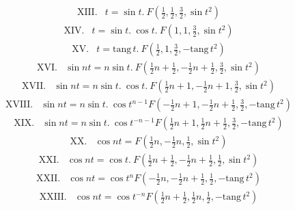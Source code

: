 \[
\begin{array}{rl}
\mathrm{XIII.}&t=\sin t.\ F(\frac{1}{2},\frac{1}{2},\frac{3}{2},\sin t^2)
\end{array}
\]
\[
\begin{array}{rl}
\mathrm{XIV.}&t=\sin t.\ \cos t.\ F(1,1,\frac{3}{2},\sin t^2)
\end{array}
\]
\[
\begin{array}{rl}
\mathrm{XV.}&t=\mathrm{tang}\,t.\ F(\frac{1}{2},1,\frac{3}{2},-\mathrm{tang}\,t^2)
\end{array}
\]
\[
\begin{array}{rl}
\mathrm{XVI.}&\sin nt=n\sin t.\ F(\frac{1}{2}n+\frac{1}{2},-\frac{1}{2}n+\frac{1}{2},\frac{3}{2},\sin t^2)
\end{array}
\]
\[
\begin{array}{rl}
\mathrm{XVII.}&\sin nt=n\sin t.\ \cos t.\ F(\frac{1}{2}n+1,-\frac{1}{2}n+1,\frac{3}{2},\sin t^2)
\end{array}
\]
\[
\begin{array}{rl}
\mathrm{XVIII.}&\sin nt=n\sin t.\ \cos t^{n-1}F(-\frac{1}{2}n+1,-\frac{1}{2}n+\frac{1}{2},\frac{3}{2},-\mathrm{tang}\,t^2)
\end{array}
\]
\[
\begin{array}{rl}
\mathrm{XIX.}&\sin nt=n\sin t.\ \cos t^{-n-1}F(\frac{1}{2}n+1,\frac{1}{2}n+\frac{1}{2},\frac{3}{2},-\mathrm{tang}\,t^2)
\end{array}
\]
\[
\begin{array}{rl}
\mathrm{XX.}&\cos nt=F(\frac{1}{2}n,-\frac{1}{2}n,\frac{1}{2},\sin t^2)
\end{array}
\]
\[
\begin{array}{rl}
\mathrm{XXI.}&\cos nt=\cos t.\ F(\frac{1}{2}n+\frac{1}{2},-\frac{1}{2}n+\frac{1}{2},\frac{1}{2},\sin t^2)
\end{array}
\]
\[
\begin{array}{rl}
\mathrm{XXII.}&\cos nt=\cos t^nF(-\frac{1}{2}n,-\frac{1}{2}n+\frac{1}{2},\frac{1}{2},-\mathrm{tang}\,t^2)
\end{array}
\]
\[
\begin{array}{rl}
\mathrm{XXIII.}&\cos nt=\cos t^{-n}F(\frac{1}{2}n+\frac{1}{2},\frac{1}{2}n,\frac{1}{2},-\mathrm{tang}\,t^2)
\end{array}
\]
